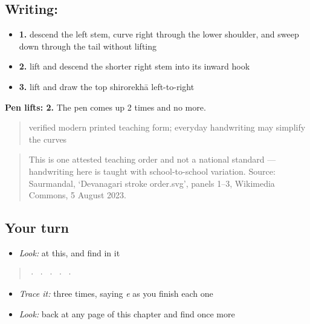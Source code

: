 \subsection*{Writing: }

\begin{itemize}
\raggedright
  \item \textbf{1.} descend the left stem, curve right through the lower shoulder, and sweep down through the tail without lifting
  \item \textbf{2.} lift and descend the shorter right stem into its inward hook
  \item \textbf{3.} lift and draw the top shirorekhā left-to-right
\end{itemize}

\textbf{Pen lifts: 2.} The pen comes up 2 times and no more.

\begin{quote}
verified modern printed teaching form; everyday handwriting may simplify the curves
\end{quote}

\begin{quote}
This is one attested teaching order and not a national standard — handwriting here is taught with school-to-school variation. Source: Saurmandal, ‘Devanagari  stroke order.svg’, panels 1–3, Wikimedia Commons, 5 August 2023.
\end{quote}

\subsection*{Your turn}
\begin{itemize}
\raggedright
  \item \emph{Look:} at this, and find  in it
\end{itemize}

\begin{quote}
      ·   ·  ·  ·  · 
\end{quote}

\begin{itemize}
\raggedright
  \item \emph{Trace it:}  three times, saying \emph{e} as you finish each one
  \item \emph{Look:} back at any page of this chapter and find  once more
\end{itemize}

